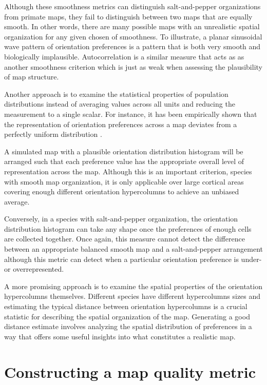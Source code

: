 \documentclass[phd,ianc,twoside]{infthesis}
\begin{document}
Although these smoothness metrics can distinguish salt-and-pepper
organizations from primate maps, they fail to distinguish between two
maps that are equally smooth. In other words, there are many possible
maps with an unrealistic spatial organization for any given chosen of
smoothness. To illustrate, a planar sinusoidal wave pattern of
orientation preferences is a pattern that is both very smooth and
biologically implausible. Autocorrelation is a similar measure that acts
as as another smoothness criterion which is just as weak when assessing
the plausibility of map structure.

Another approach is to examine the statistical properties of population
distributions instead of averaging values across all units and reducing
the measurement to a single scalar. For instance, it has been
empirically shown that the representation of orientation preferences
across a map deviates from a perfectly uniform distribution
\citep{coppola_pnas98,muller_nc00,tanaka_plosone09}.

A simulated map with a plausible orientation distribution histogram will
be arranged such that each preference value has the appropriate overall
level of representation across the map. Although this is an important
criterion, species with smooth map organization, it is only applicable
over large cortical areas covering enough different orientation
hypercolumns to achieve an unbiased average.

Conversely, in a species with salt-and-pepper organization, the
orientation distribution histogram can take any shape once the
preferences of enough cells are collected together. Once again, this
measure cannot detect the difference between an appropriate balanced
smooth map and a salt-and-pepper arrangement although this metric can
detect when a particular orientation preference is under- or
overrepresented.

A more promising approach is to examine the spatial properties of the
orientation hypercolumns themselves. Different species have different
hypercolumns sizes and estimating the typical distance between
orientation hypercolumns is a crucial statistic for describing the
spatial organization of the map. Generating a good distance estimate
involves analyzing the spatial distribution of preferences in a way that
offers some useful insights into what constitutes a realistic map.

\section{Constructing a map quality metric}
\end{document}
